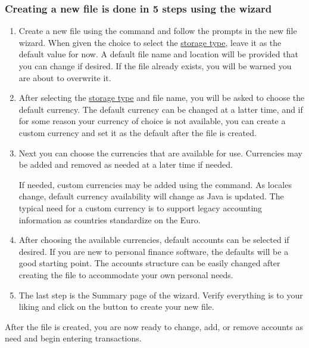 \documentclass[letterpaper,12pt]{book}
\begin{document}
    \subsubsection*{Creating a new file is done in 5 steps using the wizard}
    \begin{enumerate}
        \item Create a new file using the  command and follow the prompts in the new file wizard.
        When given the choice to select the \hyperref[subsec:fileTypes]{storage type}, leave it as the default value for now.
        A default file name and location will be provided that you can change if desired.
        If the file already exists, you will be warned you are about to overwrite it.
        \item After selecting the \hyperref[subsec:fileTypes]{storage type} and file name, you will be asked to choose
        the default currency.
        The default currency can be changed at a latter time, and if for some reason your currency of choice is not
        available, you can create a custom currency and set it as the default after the file is created.
        \item Next you can choose the currencies that are available for use.
        Currencies may be added and removed as needed at a later time if needed.

        If needed, custom currencies may be added using the  command.
        As locales change, default currency availability will change as Java is updated.
        The typical need for a custom currency is to support legacy accounting information as countries standardize on the Euro.
        \item After choosing the available currencies, default accounts can be selected if desired.
        If you are new to personal finance software, the defaults will be a good starting point.
        The accounts structure can be easily changed after creating the file to accommodate your own personal needs.
        \item The last step is the Summary page of the wizard.
        Verify everything is to your liking and click on the  button to create your new file.
    \end{enumerate}

    After the file is created, you are now ready to change, add, or remove accounts as need and begin entering transactions.
\end{document}
